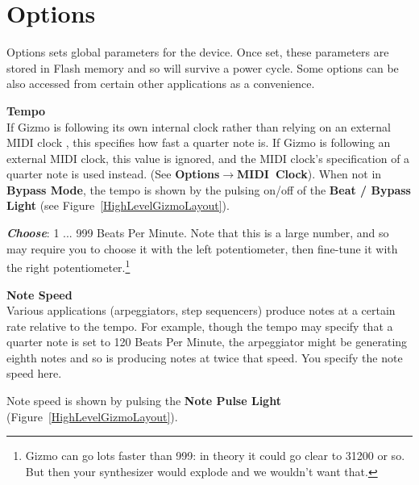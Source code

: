 \documentclass{article}
\begin{document}
\section {Options}
\label{options}

	Options sets global parameters for the device.  Once set, these parameters are stored in Flash memory and so will survive a power cycle.  Some options can be also accessed from certain other applications as a convenience.  
	
	\begin{description}


	\item{\bf Tempo}\\
	If Gizmo is following its own internal clock rather than relying on an external MIDI clock , this specifies how fast a quarter note is.  If Gizmo is following an external MIDI clock, this value is ignored, and the MIDI clock's specification of a quarter note is used instead.  (See {\bf Options\(\boldsymbol\rightarrow\)MIDI~Clock}).  When not in {\bf Bypass Mode}, the tempo is shown by the pulsing on/off of the {\bf Beat / Bypass Light} (see Figure~\ref{HighLevelGizmoLayout}). 
	
		\begin{description}
		\item{\bf \textit{Choose}}: 1 ... 999 Beats Per Minute.  Note that this is a large number, and so may require you to choose it with the left potentiometer, then fine-tune it with the right potentiometer.\footnote{Gizmo can go lots faster than 999: in theory it could go clear to 31200 or so.  But then your synthesizer would explode and we wouldn't want that.}
		\end{description}
		
	\item{\bf Note Speed}\\
		Various applications (arpeggiators, step sequencers)
		produce notes at a certain rate relative to the tempo.
		For example, though the tempo may specify that a
		quarter note is set to 120 Beats Per Minute, the 
		arpeggiator might be generating eighth notes and
		so is producing notes at twice that speed.  You specify the 
		note speed here.
		
		Note speed is shown by pulsing the {\bf Note Pulse Light} (Figure~\ref{HighLevelGizmoLayout}).


\end{description}
\end{document}
